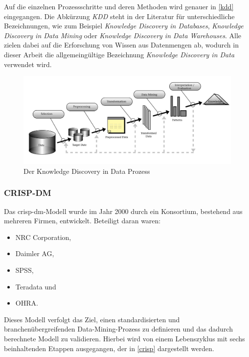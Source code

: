 Auf die einzelnen Prozessschritte und deren Methoden wird genauer in \vref{kdd} eingegangen. Die Abkürzung \textit{KDD} steht in der Literatur für unterschiedliche Bezeichnungen, wie zum Beispiel \textit{Knowledge Discovery in Databases}, \textit{Knowledge Discovery in Data Mining} oder \textit{Knowledge Discovery in Data Warehouses}. Alle zielen dabei auf die Erforschung von Wissen aus Datenmengen ab, wodurch in dieser Arbeit die allgemeingültige Bezeichnung \textit{Knowledge Discovery in Data} verwendet wird.

\begin{figure}[H]
\centering
\includegraphics[scale=0.85]{se-wa-jpg/kdd}
\caption[Der Knowledge Discovery in Data Prozess]{Der Knowledge Discovery in Data Prozess\protect\footnotemark}
\label{kddpic}
\end{figure}


\subsubsection{CRISP-DM}
Das \gls{crisp-dm}-Modell wurde im Jahr 2000 durch ein Konsortium, bestehend aus mehreren Firmen, entwickelt. Beteiligt daran waren:

\begin{itemize}
\item NRC Corporation,
\item Daimler AG,
\item SPSS,
\item Teradata und
\item OHRA.
\end{itemize}

Dieses Modell verfolgt das Ziel, einen standardisierten und branchenübergreifenden Data-Mining-Prozess zu definieren und das dadurch berechnete Modell zu validieren. Hierbei wird von einem Lebenszyklus mit sechs beinhaltenden Etappen ausgegangen, der in \vref{crisp} dargestellt werden.

